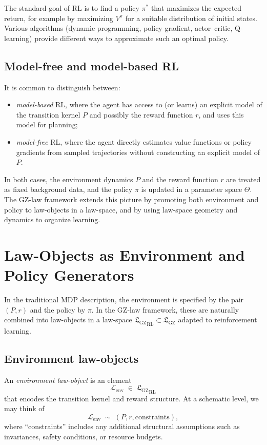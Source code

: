 \documentclass[11pt]{book}
\newcommand{\GZLS}{\ensuremath{\mathfrak{L}_{\mathrm{GZ}}}}
\theoremstyle{plain}
\theoremstyle{definition}
\theoremstyle{remark}
\begin{document}
The standard goal of RL is to find a policy $\pi^\ast$ that maximizes
the expected return, for example by maximizing $V^\pi$ for a suitable
distribution of initial states. Various algorithms (dynamic
programming, policy gradient, actor--critic, Q-learning) provide
different ways to approximate such an optimal policy.

\subsection*{Model-free and model-based RL}

It is common to distinguish between:
\begin{itemize}
  \item \emph{model-based} RL, where the agent has access to (or
        learns) an explicit model of the transition kernel $P$ and
        possibly the reward function $r$, and uses this model for
        planning;
  \item \emph{model-free} RL, where the agent directly estimates
        value functions or policy gradients from sampled trajectories
        without constructing an explicit model of $P$.
\end{itemize}

In both cases, the environment dynamics $P$ and the reward function
$r$ are treated as fixed background data, and the policy $\pi$ is
updated in a parameter space $\Theta$. The GZ-law framework extends
this picture by promoting both environment and policy to law-objects
in a law-space, and by using law-space geometry and dynamics to
organize learning.

\section{Law-Objects as Environment and Policy Generators}
\label{sec:law-objects-env-policy}


In the traditional MDP description, the environment is specified by
the pair $(P,r)$ and the policy by $\pi$. In the GZ-law framework,
these are naturally combined into law-objects in a law-space
${\GZLS}_{\mathrm{RL}} \subset \GZLS$ adapted to reinforcement
learning.

\subsection*{Environment law-objects}

An \emph{environment law-object} is an element
\[
   \mathcal{L}_{\mathrm{env}} \;\in\; {\GZLS}_{\mathrm{RL}}
\]
that encodes the transition kernel and reward structure. At a
schematic level, we may think of
\[
   \mathcal{L}_{\mathrm{env}} \;\sim\; (P,r,\text{constraints}),
\]
where ``constraints'' includes any additional structural assumptions
such as invariances, safety conditions, or resource budgets.
\end{document}
